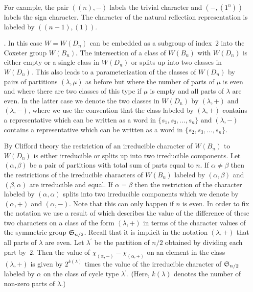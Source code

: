 For   example,  the  pair  $((n),-)$   labels  the  trivial  character  and
$(-,(1^n))$  labels  the  sign  character.  The  character  of  the natural
reflection representation is labeled by $((n-1),(1))$.

\smallskip
{}.  In this  case $W=W(D_n)$ can be
embedded  as a subgroup  of index~$2$ into  the Coxeter group $W(B_n)$. The
intersection  of a  class of  $W(B_n)$ with  $W(D_n)$ is  either empty or a
single  class in $W(D_n)$ or  splits up into two  classes in $W(D_n)$. This
also  leads to a  parameterization of the  classes of $W(D_n)$  by pairs of
partitions $(\lambda,\mu)$ as before but where the number of parts of $\mu$
is  even and where there are two classes of this type if $\mu$ is empty and
all  parts of  $\lambda$ are  even. In  the latter  case we  denote the two
classes  in $W(D_n)$ by  $(\lambda,+)$ and $(\lambda,-)$,  where we use the
convention   that   the   class   labeled   by   $(\lambda,+)$  contains  a
representative  which can be written  as a word in $\{s_1,s_3,\ldots,s_n\}$
and  $(\lambda,-)$ contains a representative which can be written as a word
in $\{s_2,s_3, \ldots,s_n\}$.

By  Clifford theory the restriction of an irreducible character of $W(B_n)$
to  $W(D_n)$  is  either  irreducible  or  splits  up  into two irreducible
components.  Let $(\alpha,\beta)$ be a pair of partitions with total sum of
parts  equal to $n$.  If $\alpha \neq  \beta$ then the  restrictions of the
irreducible characters of $W(B_n)$ labeled by $(\alpha,\beta)$ and $(\beta,
\alpha)$  are irreducible and equal. If $\alpha=\beta$ then the restriction
of  the character labeled by  $(\alpha,\alpha)$ splits into two irreducible
components which we denote by $(\alpha,+)$ and $(\alpha,-)$. Note that this
can  only happen  if $n$  is even.  In order  to fix  the notation we use a
result of \cite{Ste89} which describes the value of the difference of these
two  characters  on  a  class  of  the  form  $(\lambda,+)$ in terms of the
character  values of  the symmetric  group ${\mathfrak S}_{n/2}$.  Recall that it is
implicit  in the  notation $(\lambda,+)$  that all  parts of  $\lambda$ are
even.  Let $\lambda^\prime$ be the partition  of $n/2$ obtained by dividing
each  part by~$2$. Then  the value of $\chi_{(\alpha,-)}-\chi_{(\alpha,+)}$
on an element in the class $(\lambda,+)$ is given by $2^{k(\lambda)}$ times
the  value of the irreducible character of ${\mathfrak S}_{n/2}$ labeled by $\alpha$
on  the class of  cycle type $\lambda^\prime$.  (Here, $k(\lambda)$ denotes
the number of non-zero parts of $\lambda$.)

